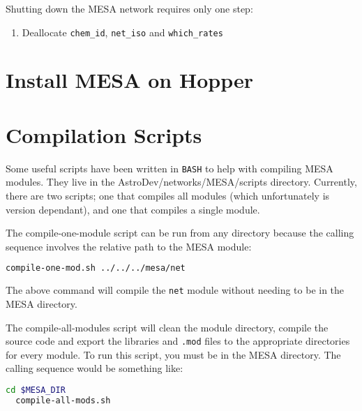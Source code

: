 Shutting down the {\sf MESA} network requires only one step:
\begin{enumerate}
\item Deallocate {\tt chem\_id}, {\tt net\_iso} and {\tt which\_rates}
\end{enumerate}


\section{Install {\sf MESA} on Hopper}
\label{sec:hopper_install}



\section{Compilation Scripts}
 \label{sec:compile_scripts}

Some useful scripts have been written in {\tt BASH} to help with compiling 
{\sf MESA} modules. They live in the {\sf AstroDev/networks/MESA/scripts} 
directory. Currently, there are two scripts; one that compiles all modules 
(which unfortunately is version dependant), and one that compiles a single 
module.

The compile-one-module script can be run from any directory because the 
calling sequence involves the relative path to the {\sf MESA} module:
\begin{lstlisting}[language=bash,mathescape=false]
  compile-one-mod.sh ../../../mesa/net
\end{lstlisting}
The above command will compile the {\tt net} module without needing to be in 
the {\sf MESA} directory.

The compile-all-modules script will clean the module directory, compile the 
source code and export the libraries and {\tt .mod} files to the appropriate 
directories for every module. To run this script, you must be in the {\sf MESA} 
directory. The calling sequence would be something like:
\begin{lstlisting}[language=bash,mathescape=false]
  cd $MESA_DIR
  compile-all-mods.sh
\end{lstlisting}




